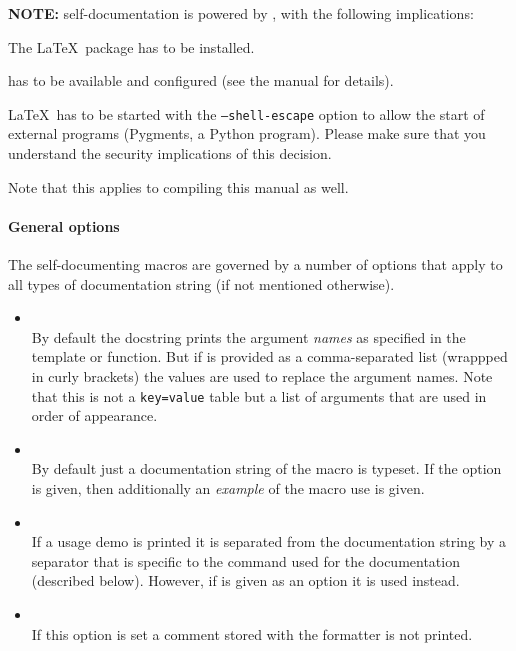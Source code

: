 \documentclass{scrartcl}
\begin{document}
\medskip

\noindent \textbf{NOTE:} self-documentation is powered by , with
the following implications:

\begin{itemize*}
\item The  \LaTeX\ package has to be installed.
\item {} has to be available and configured (see the  manual for details).
\item \LaTeX\ has to be started with the \texttt{--shell-escape} option to
allow the start of external programs (Pygments, a Python program).  Please make
sure that you understand the security implications of this decision.
\item Note that this applies to compiling this manual as well.
\end{itemize*}

\paragraph{General options}

The self-documenting macros are governed by a number of options that apply to
all types of documentation string (if not mentioned otherwise).

\begin{itemize}
\item {}\\
By default the docstring prints the argument \emph{names} as specified in the
template or function.  But if  is provided as a comma-separated
list (wrappped in curly brackets) the values are used to replace the argument
names.  Note that this is not a \texttt{key=value} table but a list of arguments
that are used in order of appearance.
\item {}\\
By default just a documentation string of the macro is typeset.  If the
 option is given, then additionally an \emph{example} of the macro
use is given.
\item {}\\
If a usage demo is printed it is separated from the documentation string by a
separator that is specific to the command used for the documentation (described
below).  However, if  is given as an option it is used instead.
\item {}\\
If this option is set a comment stored with the formatter is not printed.
\end{itemize}
\end{document}
